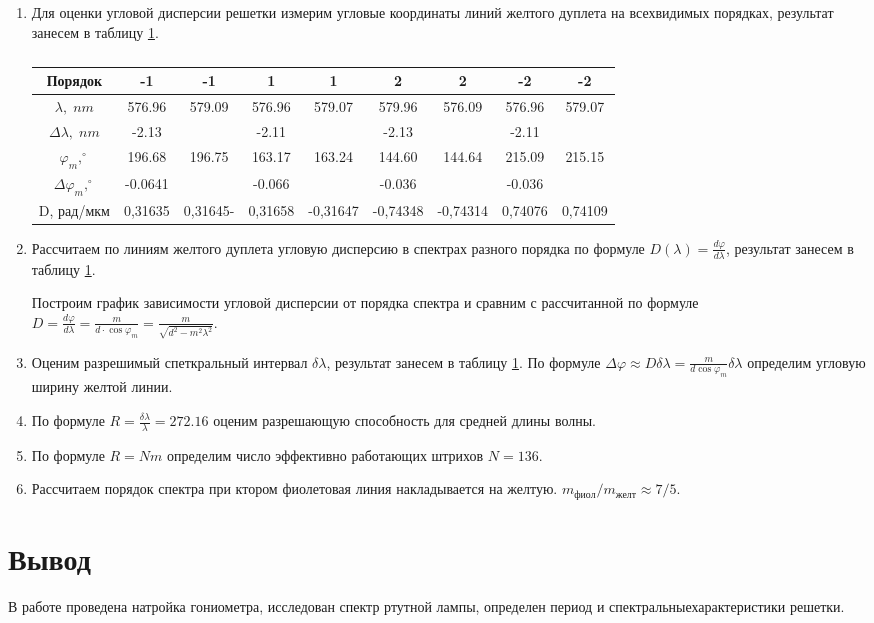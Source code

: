 \documentclass[a4paper]{article}
\begin{document}
\begin{enumerate}
    \item Для оценки угловой дисперсии решетки измерим угловые координаты линий желтого дуплета на всехвидимых порядках, результат занесем в таблицу \ref{t2}.
    
    \begin{table}[H]
        \begin{center}
            \begin{tabular}{|c|c|c|c|c|c|c|c|c|}
                \hline
                Порядок&-1&-1&1&1&2&2&-2&-2 \\ \hline 
                $\lambda, \;nm$&576.96&579.09&576.96&579.07&579.96&576.09&576.96&579.07 \\ \hline
                $\Delta \lambda, \; nm$& -2.13&&-2.11&&-2.13&&-2.11& \\ \hline
                $\varphi_m,^{\circ}$& 196.68& 196.75 &163.17 & 163.24& 144.60& 144.64& 215.09& 215.15 \\ \hline 
                $\Delta \varphi_m,^{\circ}$& -0.0641&& -0.066 && -0.036 && -0.036 & \\ \hline 
                D, рад/мкм& 0,31635&0,31645-&0,31658&-0,31647&-0,74348&-0,74314&0,74076&0,74109 \\ \hline
            \end{tabular}
            \caption{}
            \label{t2}
        \end{center}
    \end{table}

    \item Рассчитаем по линиям желтого дуплета угловую дисперсию в спектрах разного порядка по формуле $D(\lambda) = \frac{d \varphi}{d \lambda}$, результат занесем в таблицу \ref{t2}.\par 
    Построим график зависимости угловой дисперсии от порядка спектра и сравним с рассчитанной по формуле $D = \frac{d \varphi}{d \lambda} = \frac{m}{d \cdot \cos{\varphi_m}} = \frac{m}{\sqrt{d^2 - m^2 \lambda^2}}$.

    \item Оценим разрешимый спеткральный интервал $\delta \lambda$, результат занесем в таблицу \ref{t2}. По формуле $\Delta \varphi \approx D \delta \lambda = \frac{m}{d \cos{\varphi_m}} \delta \lambda$ определим угловую ширину желтой линии. 
    \item По формуле $R = \frac{\delta \lambda}{\lambda} = 272.16$ оценим разрешающую способность для средней длины волны.
    \item По формуле $R = Nm$ определим число эффективно работающих штрихов $N=136$.
    \item Рассчитаем порядок спектра при ктором фиолетовая линия накладывается на желтую. $m_{фиол}/m_{желт} \approx 7/5$.
    

\end{enumerate}

\section{Вывод}

В работе проведена натройка гониометра, исследован спектр ртутной лампы, определен период и спектральныехарактеристики решетки.
\end{document}
